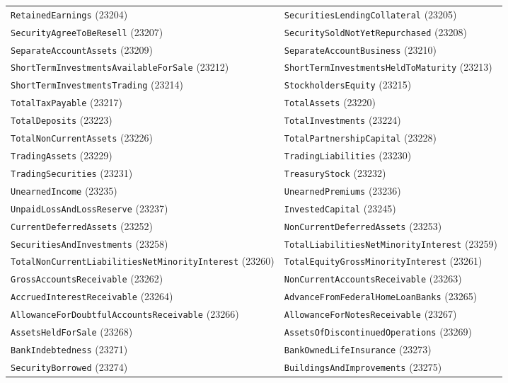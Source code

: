 \documentclass[11pt,a4paper]{report}
\begin{document}
\begin{subappendices}
{\begin{longtable}{@{}p{}p{}@{}}
\texttt{RetainedEarnings} (23204) & \texttt{SecuritiesLendingCollateral} (23205) \\
\texttt{SecurityAgreeToBeResell} (23207) & \texttt{SecuritySoldNotYetRepurchased} (23208) \\
\texttt{SeparateAccountAssets} (23209) & \texttt{SeparateAccountBusiness} (23210) \\
\texttt{ShortTermInvestmentsAvailableForSale} (23212) & \texttt{ShortTermInvestmentsHeldToMaturity} (23213) \\
\texttt{ShortTermInvestmentsTrading} (23214) & \texttt{StockholdersEquity} (23215) \\
\texttt{TotalTaxPayable} (23217) & \texttt{TotalAssets} (23220) \\
\texttt{TotalDeposits} (23223) & \texttt{TotalInvestments} (23224) \\
\texttt{TotalNonCurrentAssets} (23226) & \texttt{TotalPartnershipCapital} (23228) \\
\texttt{TradingAssets} (23229) & \texttt{TradingLiabilities} (23230) \\
\texttt{TradingSecurities} (23231) & \texttt{TreasuryStock} (23232) \\
\texttt{UnearnedIncome} (23235) & \texttt{UnearnedPremiums} (23236) \\
\texttt{UnpaidLossAndLossReserve} (23237) & \texttt{InvestedCapital} (23245) \\
\texttt{CurrentDeferredAssets} (23252) & \texttt{NonCurrentDeferredAssets} (23253) \\
\texttt{SecuritiesAndInvestments} (23258) & \texttt{TotalLiabilitiesNetMinorityInterest} (23259) \\
\texttt{TotalNonCurrentLiabilitiesNetMinorityInterest} (23260) & \texttt{TotalEquityGrossMinorityInterest} (23261) \\
\texttt{GrossAccountsReceivable} (23262) & \texttt{NonCurrentAccountsReceivable} (23263) \\
\texttt{AccruedInterestReceivable} (23264) & \texttt{AdvanceFromFederalHomeLoanBanks} (23265) \\
\texttt{AllowanceForDoubtfulAccountsReceivable} (23266) & \texttt{AllowanceForNotesReceivable} (23267) \\
\texttt{AssetsHeldForSale} (23268) & \texttt{AssetsOfDiscontinuedOperations} (23269) \\
\texttt{BankIndebtedness} (23271) & \texttt{BankOwnedLifeInsurance} (23273) \\
\texttt{SecurityBorrowed} (23274) & \texttt{BuildingsAndImprovements} (23275) \\

\end{longtable}}
\end{subappendices}
\end{document}
